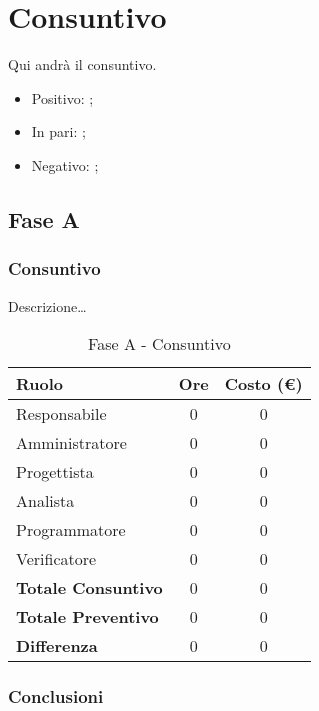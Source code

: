 \documentclass[../PianoProgetto.tex]{subfiles}
\begin{document}
\section{Consuntivo}
\label{sec:consuntivo}

	Qui andrà il consuntivo.

	\begin{itemize}
		\item Positivo: ;
		\item In pari: ;
		\item Negativo: ;
	\end{itemize}

	\subsection{Fase A}
		\subsubsection{Consuntivo}
		Descrizione\dots
		
\begin{table}[h]
		\centering
		\begin{tabular}{l * {2}{c}}
			\toprule
			\textbf{Ruolo} & \textbf{Ore} & \textbf{Costo (\euro{})} \\
			\midrule
			Responsabile &	0 & 0 \\
			Amministratore & 0 & 0 \\
			Progettista & 0 & 0 \\
			Analista & 0 & 0 \\
			Programmatore & 0 & 0 \\
			Verificatore & 0 & 0 \\
			\midrule		
			\textbf{Totale Consuntivo} & 0 & 0 \\
			\textbf{Totale Preventivo} & 0 & 0 \\
			\midrule
			\textbf{Differenza} & 0 & 0 \\
			\bottomrule
		\end{tabular}
		
		\caption{Fase A - Consuntivo}
		\label{tab:consuntivoA}
		
	\end{table}		
		
		\subsubsection{Conclusioni}	

	
\end{document}
